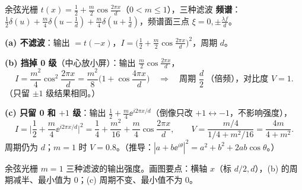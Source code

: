 \begin{exam}{余弦光栅 $t(x)=\frac12+\frac m2\cos\frac{2\pi x}{d}$（$0<m\le1$），三种滤波}
\textbf{频谱}：$\frac12\delta(u)+\frac m4\delta(u-\frac1d)+\frac m4\delta(u+\frac1d)$，频谱面三点 $\xi=0,\pm\frac{\lambda f}{d}$。

\textbf{(a) 不滤波}：输出 $=t(-x)$，$I=\big(\frac12+\frac m2\cos\frac{2\pi x}d\big)^2$，周期 $d$。

\textbf{(b) 挡掉 0 级}（中心放小屏）：输出 $\frac m2\cos\frac{2\pi x}{d}$，
\[
I=\frac{m^2}{4}\cos^2\frac{2\pi x}{d}=\frac{m^2}{8}\Big(1+\cos\frac{4\pi x}{d}\Big)\quad\Rightarrow\quad\text{周期 }\frac d2\ \text{（倍频），对比度 }V=1.
\]
（只留 $\pm1$ 级结果相同。）

\textbf{(c) 只留 0 和 $+1$ 级}：输出 $\frac12+\frac m4\ee^{i2\pi x/d}$（倒像只改 $+1\leftrightarrow-1$，不影响强度），
\[
I=\Big|\frac12+\frac m4\ee^{i2\pi x/d}\Big|^2=\frac14+\frac{m^2}{16}+\frac m4\cos\frac{2\pi x}{d},\qquad V=\frac{m/4}{1/4+m^2/16}=\frac{4m}{4+m^2}.
\]
周期仍为 $d$；$m=1$ 时 $V=0.8$。（推导：$|a+b\ee^{i\theta}|^2=a^2+b^2+2ab\cos\theta$。）
\end{exam}

\begin{center}

\small 余弦光栅 $m=1$ 三种滤波的输出强度。画图要点：横轴 $x$（标 $d/2,d$），(b) 的周期减半、最小值为 0；(c) 周期不变、最小值不为 0。
\end{center}

